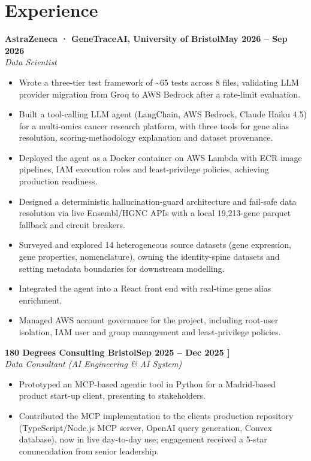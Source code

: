 \documentclass[a4paper,11pt]{article}
\newcommand{\entry}[4]{\needspace{4\baselineskip}\noindent\textbf{#1}\hfill\textbf{#2}\\ \textit{#3}\hfill\textit{#4}\par}
\begin{document}
\section{Experience}
\entry{AstraZeneca · GeneTraceAI, University of Bristol}{May 2026 – Sep 2026}{Data Scientist}{}
\begin{itemize}
  \item Wrote a three-tier test framework of \textasciitilde{}65 tests across 8 files, validating LLM provider migration from Groq to AWS Bedrock after a rate-limit evaluation.
  \item Built a tool-calling LLM agent (LangChain, AWS Bedrock, Claude Haiku 4.5) for a multi-omics cancer research platform, with three tools for gene alias resolution, scoring-methodology explanation and dataset provenance.
  \item Deployed the agent as a Docker container on AWS Lambda with ECR image pipelines, IAM execution roles and least-privilege policies, achieving production readiness.
  \item Designed a deterministic hallucination-guard architecture and fail-safe data resolution via live Ensembl/HGNC APIs with a local 19,213-gene parquet fallback and circuit breakers.
  \item Surveyed and explored 14 heterogeneous source datasets (gene expression, gene properties, nomenclature), owning the identity-spine datasets and setting metadata boundaries for downstream modelling.
  \item Integrated the agent into a React front end with real-time gene alias enrichment.
  \item Managed AWS account governance for the project, including root-user isolation, IAM user and group management and least-privilege policies.
\end{itemize}
\vspace{4pt}
\entry{180 Degrees Consulting Bristol}{Sep 2025 – Dec 2025   ]}{Data Consultant (AI Engineering \& AI System)}{}
\begin{itemize}
  \item Prototyped an MCP-based agentic tool in Python for a Madrid-based product start-up client, presenting to stakeholders.
  \item Contributed the MCP implementation to the client\textquotesingle{}s production repository (TypeScript/Node.js MCP server, OpenAI query generation, Convex database), now in live day-to-day use; engagement received a 5-star commendation from senior leadership.
\end{itemize}
\end{document}
